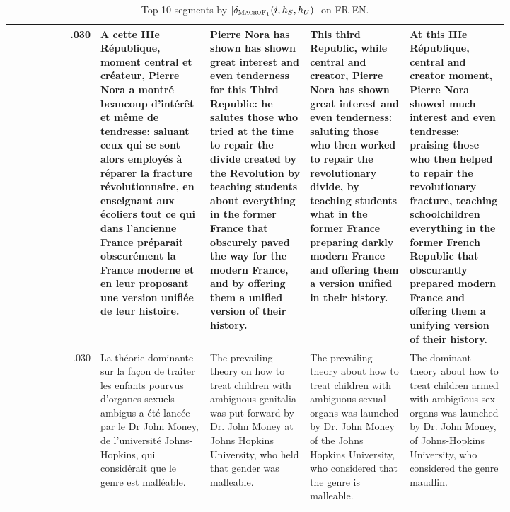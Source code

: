 \begin{table}[ht]
\begin{tabular}{r @{\hspace{2mm}} p{0.22\linewidth}p{0.20\linewidth}p{0.20\linewidth}p{0.20\linewidth}}
.030 & A cette IIIe République, moment central et créateur, Pierre Nora a montré beaucoup d'intérêt et même de tendresse: saluant ceux qui se sont alors employés à réparer la fracture révolutionnaire, en enseignant aux écoliers tout ce qui dans l'ancienne France préparait obscurément la France moderne et en leur proposant une version unifiée de leur histoire. & Pierre Nora has shown has shown great interest and even tenderness for this Third Republic: he salutes those who tried at the time to repair the divide created by the Revolution by teaching students about everything in the former France that obscurely paved the way for the modern France, and by offering them a unified version of their history. & This third Republic, while central and creator, Pierre Nora has shown great interest and even tenderness: saluting those who then worked to repair the revolutionary divide, by teaching students what in the former France preparing darkly modern France and offering them a version unified in their history. & At this IIIe République, central and creator moment, Pierre Nora showed much interest and even tendresse: praising those who then helped to repair the revolutionary fracture, teaching schoolchildren everything in the former French Republic that obscurantly prepared modern France and offering them a unifying version of their history. \\\hline
.030 & La théorie dominante sur la façon de traiter les enfants pourvus d'organes sexuels ambigus a été lancée par le Dr John Money, de l'université Johns-Hopkins, qui considérait que le genre est malléable. & The prevailing theory on how to treat children with ambiguous genitalia was put forward by Dr. John Money at Johns Hopkins University, who held that gender was malleable. & The prevailing theory about how to treat children with ambiguous sexual organs was launched by Dr. John Money of the Johns Hopkins University, who considered that the genre is malleable. & The dominant theory about how to treat children armed with ambigüous sex organs was launched by Dr. John Money, of Johns-Hopkins University, who considered the genre maudlin. \\
\end{tabular}
\caption{Top 10 segments by $|\delta_{\textsc{MacroF}{\text{$_{{1}}$}}}(i, h_S, h_U)|$ on FR-EN.}
\label{tab:maf1-top-10-fren}
\end{table}



